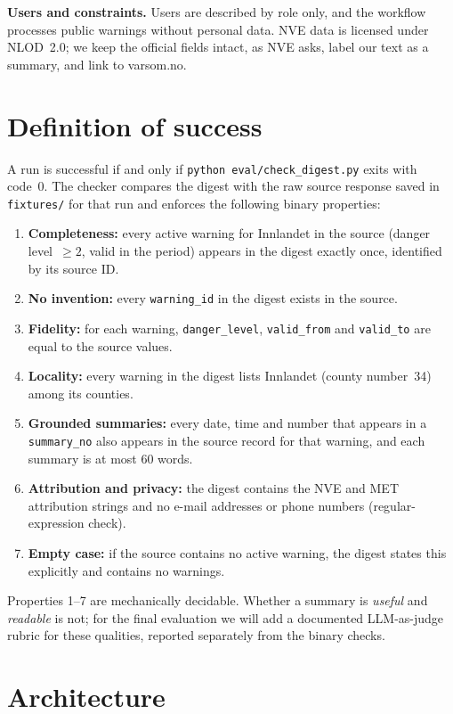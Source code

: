 \documentclass{article}
\newcommand{\code}[1]{\texttt{#1}}
\begin{document}
\textbf{Users and constraints.} Users are described by role only, and the workflow processes public warnings without personal data. NVE data is licensed under NLOD~2.0; we keep the official fields intact, as NVE asks, label our text as a summary, and link to varsom.no.

\section{Definition of success}

A run is successful if and only if \code{python eval/check\_digest.py} exits with code~0. The checker compares the digest with the raw source response saved in \code{fixtures/} for that run and enforces the following binary properties:

\begin{enumerate}
  \item \textbf{Completeness:} every active warning for Innlandet in the source (danger level~$\geq 2$, valid in the period) appears in the digest exactly once, identified by its source ID.
  \item \textbf{No invention:} every \code{warning\_id} in the digest exists in the source.
  \item \textbf{Fidelity:} for each warning, \code{danger\_level}, \code{valid\_from} and \code{valid\_to} are equal to the source values.
  \item \textbf{Locality:} every warning in the digest lists Innlandet (county number~34) among its counties.
  \item \textbf{Grounded summaries:} every date, time and number that appears in a \code{summary\_no} also appears in the source record for that warning, and each summary is at most 60 words.
  \item \textbf{Attribution and privacy:} the digest contains the NVE and MET attribution strings and no e-mail addresses or phone numbers (regular-expression check).
  \item \textbf{Empty case:} if the source contains no active warning, the digest states this explicitly and contains no warnings.
\end{enumerate}

Properties 1--7 are mechanically decidable. Whether a summary is \emph{useful} and \emph{readable} is not; for the final evaluation we will add a documented LLM-as-judge rubric for these qualities, reported separately from the binary checks.

\section{Architecture}
\end{document}

